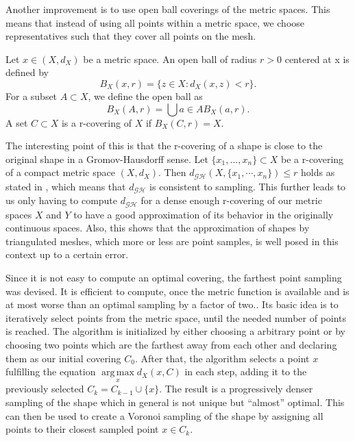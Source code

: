 Another improvement is to use open ball coverings of the metric spaces.
This means that instead of using all points within a metric space, we choose representatives such that they cover all points on the mesh.
\begin{mydef}
	Let $x \in (X,d_X)$ be a metric space. An open ball of radius $r > 0$ centered at x is defined by
	$$B_X(x,r) = \{z\in X:d_X(x,z) < r\}.$$
	For a subset $A \subset X$, we define the open ball as
	$$B_X(A,r) = \bigcup{a\in A} B_X(a,r).$$
	A set $C\subset X$ is a r-covering of $X$ if $B_X(C,r) = X$.
\end{mydef}
The interesting point of this is that the r-covering of a shape is close to the original shape in a Gromov-Hausdorff sense.
Let $\{x_1,\ldots,x_n\}\subset X$ be a r-covering of a compact metric space $(X,d_X)$.
Then $d_\mathcal{GH}(X,\{x_1,\cdots,x_n\}) \le r$ holds as stated in \cite{bronstein2008numerical}, which means that $d_\mathcal{GH}$ is consistent to sampling.
This further leads to us only having to compute $d_\mathcal{GH}$ for a dense enough r-covering of our metric spaces $X$ and $Y$ to have a good approximation of its behavior in the originally continuous spaces.
Also, this shows that the approximation of shapes by triangulated meshes, which more or less are point samples, is well posed in this context up to a certain error.

Since it is not easy to compute an optimal covering, the farthest point sampling was devised.
It is efficient to compute, once the metric function is available and is at most worse than an optimal sampling by a factor of two..
Its basic idea is to iteratively select points from the metric space, until the needed number of points is reached.
The algorithm is initialized by either choosing a arbitrary point or by choosing two points which are the farthest away from each other and declaring them as our initial covering $C_0$.
After that, the algorithm selects a point $x$ fulfilling the equation $\underset{x}{\operatorname{arg\,max}} d_X(x,C)$ in each step, adding it to the previously selected $C_k = C_{k-1} \cup \{x\}$.
The result is a progressively denser sampling of the shape which in general is not unique but ``almost'' optimal.
This can then be used to create a Voronoi sampling of the shape by assigning all points to their closest sampled point $x \in C_k$.

